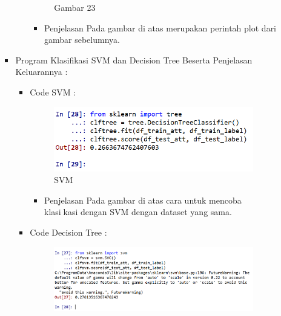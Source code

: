 \begin{enumerate}
\begin{itemize}
\begin{itemize}
\begin{itemize}
\begin{figure}[ht]
\caption{Gambar 23}
\label{contoh}
\end{figure}
\par
\begin{itemize}
\item Penjelasan  Pada gambar di atas merupakan perintah plot dari gambar sebelumnya.
\par
\par
\par
\end{itemize}

\end{itemize}

\par
\par
\item Program Klasifikasi SVM dan Decision Tree Beserta Penjelasan Keluarannya :
\begin{itemize}
\item Code SVM :
\par
\begin{figure}[ht]
\centering
\includegraphics[scale=0.7]{figures/andi/RF25.PNG}
\caption{SVM}
\label{contoh}
\end{figure}
\par
\begin{itemize}
\item Penjelasan  Pada gambar di atas cara untuk mencoba klasikasi dengan SVM dengan dataset yang sama.
\par 
\par
\end{itemize}
\item Code Decision Tree :
\par
\begin{figure}[ht]
\centering
\includegraphics[scale=0.7]{figures/andi/RF26.PNG}

\end{figure}
\end{itemize}
\end{itemize}
\end{itemize}
\end{enumerate}
